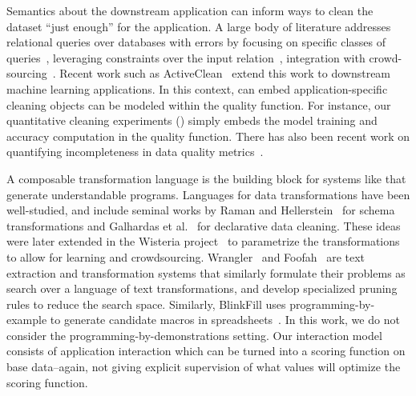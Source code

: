 Semantics about the downstream application can inform ways to clean the dataset ``just enough'' for the application.  
A large body of literature addresses relational queries over databases with errors by focusing on specific classes of queries~\cite{altwaijry2015query}, leveraging constraints over the input relation~\cite{2011Bertossi}, integration with crowd-sourcing~\cite{DBLP:conf/sigmod/BergmanMNT15}.   Recent work such as ActiveClean~\cite{DBLP:journals/pvldb/KrishnanWWFG16} extend this work to downstream machine learning applications.   In this context, \sys can embed application-specific cleaning objects can be modeled within the quality function.  For instance, our quantitative cleaning experiments () simply embeds the model training and accuracy computation in the quality function. 
There has also been recent work on quantifying incompleteness in data quality metrics~\cite{chung2016data}.


 A composable transformation language is the building block for systems like \sys that generate understandable programs.   Languages for data transformations have been well-studied, and include seminal works by Raman and Hellerstein~\cite{raman2001potter} for schema transformations and Galhardas et al.~\cite{DBLP:conf/vldb/GalhardasFSSS01} for declarative data cleaning. These ideas were later extended in the Wisteria project~\cite{DBLP:journals/pvldb/HaasKWF015} to parametrize the transformations to allow for learning and crowdsourcing.   Wrangler~\cite{wrangler} and Foofah~\cite{jin2017foofah} are text extraction and transformation systems that similarly formulate their problems as search over a language of text transformations, and develop specialized pruning rules to reduce the search space. Similarly, BlinkFill uses programming-by-example to generate candidate macros in spreadsheets~\cite{singh2016blinkfill}. In this work, we do not consider the programming-by-demonstrations setting. Our interaction model consists of application interaction which can be turned into a scoring function on base data--again, not giving explicit supervision of what values will optimize the scoring function.


